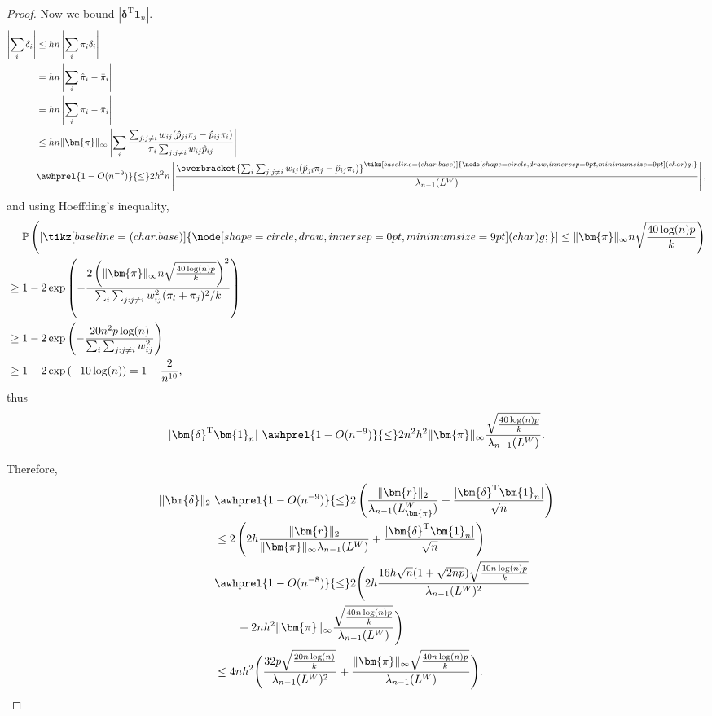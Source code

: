 \documentclass[sigconf,nonacm,pbalance]{acmart}
\newcommand{\tran}{{\mathrm{T}}}
\newcommand{\circled}[1]{
    \tikz[baseline=(char.base)]{\node[shape=circle, draw, inner sep=0pt,minimum size=9pt] (char) {#1};}
}
\begin{document}
\begin{proof}
Now we bound $|\bm{\delta}^\tran \bm{1}_n|$.
\begin{align}
\left|\sum_i \delta_i \right| &\leq hn \left|\sum_i \pi_i \delta_i\right|\\
&=hn\left|\sum_i \hat{\pi}_i-\bar{\pi}_i\right| \\
&=hn\left|\sum_i \pi_i-\bar{\pi}_i\right| \\
&\leq hn \|\bm{\pi}\|_\infty \left|\sum_i \frac{ \sum_{j:j\neq i} w_{ij} (\hat{p}_{ji} \pi_j - \hat{p}_{ij}\pi_i)}{ \pi_i\sum_{j:j\neq i} w_{ij} \hat{p}_{ij}}\right| \\
&\awhprel{1-O(n^{-9})}{\leq} 2h^2n \left| \frac{ \overbracket{\textstyle\sum_i\sum_{j:j\neq i} w_{ij} (\hat{p}_{ji} \pi_j - \hat{p}_{ij}\pi_i)}^{\circled{g}}}{ \lambda_{n-1}(L^W)}\right|,
\end{align}
and using Hoeffding's inequality,
\begin{align}
&\phantom{{}={}}\mathbb{P}\left(|\circled{g}| \leq \|\bm{\pi}\|_\infty n\sqrt{\frac{40\log(n)p}{k}}\right) \\
&\geq 1 - 2 \exp\left(-\frac{2\left(\|\bm{\pi}\|_\infty n \sqrt{\frac{40\log(n)p}{k}}\right)^2}{\sum_i\sum_{j:j\neq i} w_{ij}^2 (\pi_l+\pi_j)^2/k}\right) \\
&\geq 1 - 2\exp \left(-\frac{20 n^2p\log(n) }{\sum_i\sum_{j:j\neq i} w_{ij}^2}\right) \\
&\geq 1 - 2 \exp\left(-10\log(n)\right) = 1 - \frac{2}{n^{10}},
\end{align}
thus
\begin{equation}
|\bm{\delta}^\tran \bm{1}_n|\  \awhprel{1-O(n^{-9})}{\leq} 2n^2h^2 \|\bm{\pi}\|_\infty \frac{\sqrt{\frac{40\log(n)p}{k}}}{\lambda_{n-1}(L^W)}.
\end{equation}

Therefore,
\begin{align}
\|\bm{\delta}\|_2\  &\awhprel{1-O(n^{-9})}{\leq} 2\left(\frac{\|\bm{r}\|_2}{\lambda_{n-1}(L_{\bm{\pi}}^W)}+\frac{|\bm{\delta}^\tran \bm{1}_n|}{\sqrt{n}}\right) \\
&\leq 2\left(2h\frac{\|\bm{r}\|_2}{\|\bm{\pi}\|_\infty\lambda_{n-1}(L^W)}+\frac{|\bm{\delta}^\tran \bm{1}_n|}{\sqrt{n}}\right) \\
&\awhprel{1-O(n^{-8})}{\leq} 2\Biggl(2h\frac{16h\sqrt{n}(1+\sqrt{2np}) \sqrt{\frac{10n\log(n)p}{k}}}{\lambda_{n-1}(L^W)^2}\\
&\qquad +2nh^2 \|\bm{\pi}\|_\infty \frac{\sqrt{\frac{40n\log(n)p}{k}}}{\lambda_{n-1}(L^W)}\Biggr) \\
&\leq 4nh^2\Biggl(\frac{32p \sqrt{\frac{20n\log(n)}{k}}}{\lambda_{n-1}(L^W)^2}+ \frac{\|\bm{\pi}\|_\infty\sqrt{\frac{40n\log(n)p}{k}}}{\lambda_{n-1}(L^W)}\Biggr).
\end{align}


\end{proof}
\end{document}
